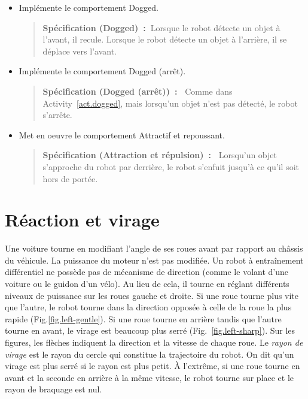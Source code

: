 \begin{framed}
\begin{itemize}
\item Implémente le comportement Dogged.
\begin{quote}
\normalsize\noindent\textbf{Spécification (Dogged)~:~}Lorsque le robot détecte un objet à l'avant, il recule. Lorsque le robot détecte un objet à l'arrière, il se déplace vers l'avant.
\end{quote}
\end{itemize}
\end{framed}

\begin{framed}
\begin{itemize}
\item Implémente le comportement Dogged (arrêt).
\begin{quote}
\normalsize\noindent\textbf{Spécification (Dogged (arrêt))~:~} Comme dans Activity~\ref{act.dogged}, mais lorsqu'un objet n'est pas détecté, le robot s'arrête.
\end{quote}
\end{itemize}
\end{framed}

\begin{framed}
\begin{itemize}
\item Met en oeuvre le comportement Attractif et repoussant.
\begin{quote}
\normalsize\noindent\textbf{Spécification (Attraction et répulsion)~:~} Lorsqu'un objet s'approche du robot par derrière, le robot s'enfuit jusqu'à ce qu'il soit hors de portée.
\end{quote}
\end{itemize}
\end{framed}


\section{Réaction et virage}\label{s.turning}

Une voiture tourne en modifiant l'angle de ses roues avant par rapport au châssis du véhicule. La puissance du moteur n'est pas modifiée. Un robot à entraînement différentiel ne possède pas de mécanisme de direction (comme le volant d'une voiture ou le guidon d'un vélo). Au lieu de cela, il tourne en réglant différents niveaux de puissance sur les roues gauche et droite. Si une roue tourne plus vite que l'autre, le robot tourne dans la direction opposée à celle de la roue la plus rapide (Fig.\ref{fig.left-gentle}). Si une roue tourne en arrière tandis que l'autre tourne en avant, le virage est beaucoup plus serré (Fig.~\ref{fig.left-sharp}). Sur les figures, les flèches indiquent la direction et la vitesse de chaque roue. Le \emph{rayon de virage} est le rayon du cercle qui constitue la trajectoire du robot. On dit qu'un virage est plus serré si le rayon est plus petit. À l'extrême, si une roue tourne en avant et la seconde en arrière à la même vitesse, le robot tourne sur place et le rayon de braquage est nul.

